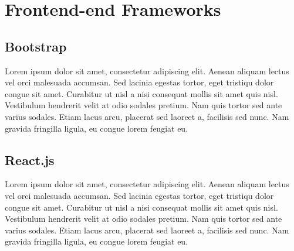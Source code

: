 \section{Frontend-end Frameworks}
\label{sec:frontend}

\subsection{Bootstrap}
\label{sub-sec:bootstrap}

Lorem ipsum dolor sit amet, consectetur adipiscing elit. Aenean aliquam lectus vel orci malesuada accumsan. Sed lacinia egestas tortor, eget tristiqu dolor congue sit amet. Curabitur ut nisl a nisi consequat mollis sit amet quis nisl. Vestibulum hendrerit velit at odio sodales pretium. Nam quis tortor sed ante varius sodales. Etiam lacus arcu, placerat sed laoreet a, facilisis sed nunc. Nam gravida fringilla ligula, eu congue lorem feugiat eu.

\subsection{React.js}
\label{sub-sec:react}

Lorem ipsum dolor sit amet, consectetur adipiscing elit. Aenean aliquam lectus vel orci malesuada accumsan. Sed lacinia egestas tortor, eget tristiqu dolor congue sit amet. Curabitur ut nisl a nisi consequat mollis sit amet quis nisl. Vestibulum hendrerit velit at odio sodales pretium. Nam quis tortor sed ante varius sodales. Etiam lacus arcu, placerat sed laoreet a, facilisis sed nunc. Nam gravida fringilla ligula, eu congue lorem feugiat eu.